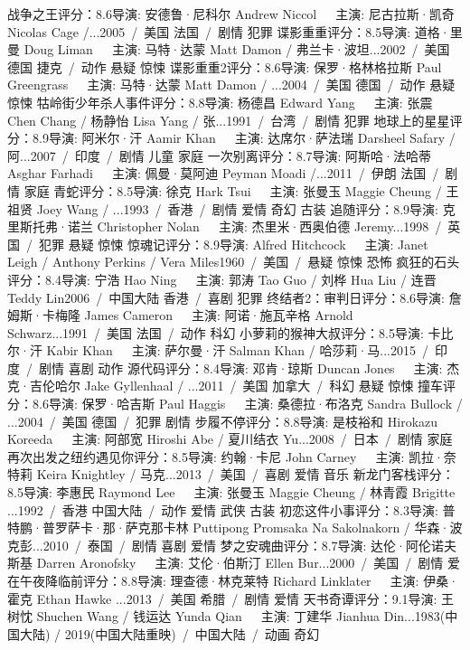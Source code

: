 战争之王评分：8.6导演: 安德鲁·尼科尔 Andrew Niccol   主演: 尼古拉斯·凯奇 Nicolas Cage /...2005 / 美国 法国 / 剧情 犯罪
谍影重重评分：8.5导演: 道格·里曼 Doug Liman   主演: 马特·达蒙 Matt Damon / 弗兰卡·波坦...2002 / 美国 德国 捷克 / 动作 悬疑 惊悚
谍影重重2评分：8.6导演: 保罗·格林格拉斯 Paul Greengrass   主演: 马特·达蒙 Matt Damon / ...2004 / 美国 德国 / 动作 悬疑 惊悚
牯岭街少年杀人事件评分：8.8导演: 杨德昌 Edward Yang   主演: 张震 Chen Chang / 杨静怡 Lisa Yang / 张...1991 / 台湾 / 剧情 犯罪
地球上的星星评分：8.9导演: 阿米尔·汗 Aamir Khan   主演: 达席尔·萨法瑞 Darsheel Safary / 阿...2007 / 印度 / 剧情 儿童 家庭
一次别离评分：8.7导演: 阿斯哈·法哈蒂  Asghar Farhadi   主演: 佩曼·莫阿迪 Peyman Moadi /...2011 / 伊朗 法国 / 剧情 家庭
青蛇评分：8.5导演: 徐克 Hark Tsui   主演: 张曼玉 Maggie Cheung / 王祖贤 Joey Wang / ...1993 / 香港 / 剧情 爱情 奇幻 古装
追随评分：8.9导演: 克里斯托弗·诺兰 Christopher Nolan   主演: 杰里米·西奥伯德 Jeremy...1998 / 英国 / 犯罪 悬疑 惊悚
惊魂记评分：8.9导演: Alfred Hitchcock   主演: Janet Leigh / Anthony Perkins / Vera Miles1960 / 美国 / 悬疑 惊悚 恐怖
疯狂的石头评分：8.4导演: 宁浩 Hao Ning   主演: 郭涛 Tao Guo / 刘桦 Hua Liu / 连晋 Teddy Lin2006 / 中国大陆 香港 / 喜剧 犯罪
终结者2：审判日评分：8.6导演: 詹姆斯·卡梅隆 James Cameron   主演: 阿诺·施瓦辛格 Arnold Schwarz...1991 / 美国 法国 / 动作 科幻
小萝莉的猴神大叔评分：8.5导演: 卡比尔·汗 Kabir Khan   主演: 萨尔曼·汗 Salman Khan / 哈莎莉·马...2015 / 印度 / 剧情 喜剧 动作
源代码评分：8.4导演: 邓肯·琼斯 Duncan Jones   主演: 杰克·吉伦哈尔 Jake Gyllenhaal / ...2011 / 美国 加拿大 / 科幻 悬疑 惊悚
撞车评分：8.6导演: 保罗·哈吉斯 Paul Haggis   主演: 桑德拉·布洛克 Sandra Bullock / ...2004 / 美国 德国 / 犯罪 剧情
步履不停评分：8.8导演: 是枝裕和 Hirokazu Koreeda   主演: 阿部宽 Hiroshi Abe / 夏川结衣 Yu...2008 / 日本 / 剧情 家庭
再次出发之纽约遇见你评分：8.5导演: 约翰·卡尼 John Carney   主演: 凯拉·奈特莉 Keira Knightley / 马克...2013 / 美国 / 喜剧 爱情 音乐
新龙门客栈评分：8.5导演: 李惠民 Raymond Lee   主演: 张曼玉 Maggie Cheung / 林青霞 Brigitte ...1992 / 香港 中国大陆 / 动作 爱情 武侠 古装
初恋这件小事评分：8.3导演: 普特鹏·普罗萨卡·那·萨克那卡林 Puttipong Promsaka Na Sakolnakorn / 华森·波克彭...2010 / 泰国 / 剧情 喜剧 爱情
梦之安魂曲评分：8.7导演: 达伦·阿伦诺夫斯基 Darren Aronofsky   主演: 艾伦·伯斯汀 Ellen Bur...2000 / 美国 / 剧情
爱在午夜降临前评分：8.8导演: 理查德·林克莱特 Richard Linklater   主演: 伊桑·霍克 Ethan Hawke ...2013 / 美国 希腊 / 剧情 爱情
天书奇谭评分：9.1导演: 王树忱 Shuchen Wang / 钱运达 Yunda Qian   主演: 丁建华 Jianhua Din...1983(中国大陆) / 2019(中国大陆重映) / 中国大陆 / 动画 奇幻
